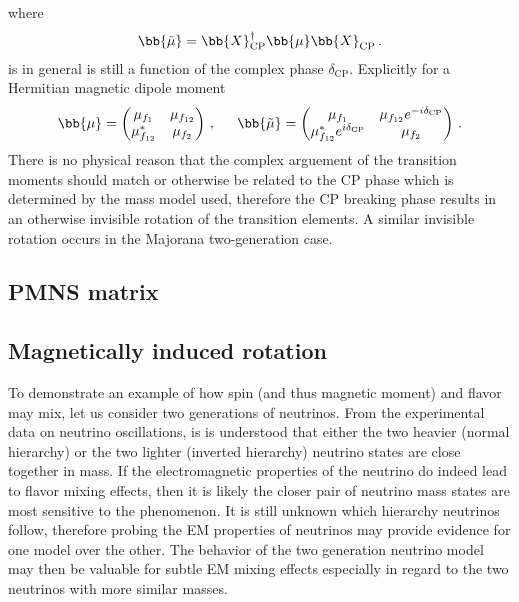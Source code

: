 where
\begin{alignat}{1}
	\label{cp:eq:06b} \bb{\tilde{\mu}}=\bb{X}_{\mathrm{CP}}^{\dagger}\bb{\mu}\bb{X}_{\mathrm{CP}}\,.
\end{alignat}
 is in general is still a function of the complex phase $\delta_{\mathrm{CP}}$. Explicitly for a Hermitian magnetic dipole moment
\begin{alignat}{1}
	\label{cp:eq:07a} \bb{\mu}=
	\begin{pmatrix}
		\mu_{f_{1}}&\mu_{f_{12}}\\
		\mu_{f_{12}}^{*}&\mu_{f_{2}}
	\end{pmatrix}\,,\indent \bb{\tilde{\mu}}=
	\begin{pmatrix}
		\mu_{f_{1}}&\mu_{f_{12}}e^{-i\delta_{\mathrm{CP}}}\\
		\mu_{f_{12}}^{*}e^{i\delta_{\mathrm{CP}}}&\mu_{f_{2}}
	\end{pmatrix}\,.
\end{alignat}
There is no physical reason that the complex arguement of the transition moments should match or otherwise be related to the CP phase which is determined by the mass model used, therefore the CP breaking phase results in an otherwise invisible rotation of the transition elements. A similar invisible rotation occurs in the Majorana two-generation case.

\subsection{PMNS matrix}

\subsection{Magnetically induced rotation}
\noindent To demonstrate an example of how spin (and thus magnetic moment) and flavor may mix, let us consider two generations of neutrinos. From the experimental data on neutrino oscillations, is is understood that either the two heavier (normal hierarchy) or the two lighter (inverted hierarchy) neutrino states are close together in mass. If the electromagnetic properties of the neutrino do indeed lead to flavor mixing effects, then it is likely the closer pair of neutrino mass states are most sensitive to the phenomenon. It is still unknown which hierarchy neutrinos follow, therefore probing the EM properties of neutrinos may provide evidence for one model over the other. The behavior of the two generation neutrino model may then be valuable for subtle EM mixing effects especially in regard to the two neutrinos with more similar masses.

